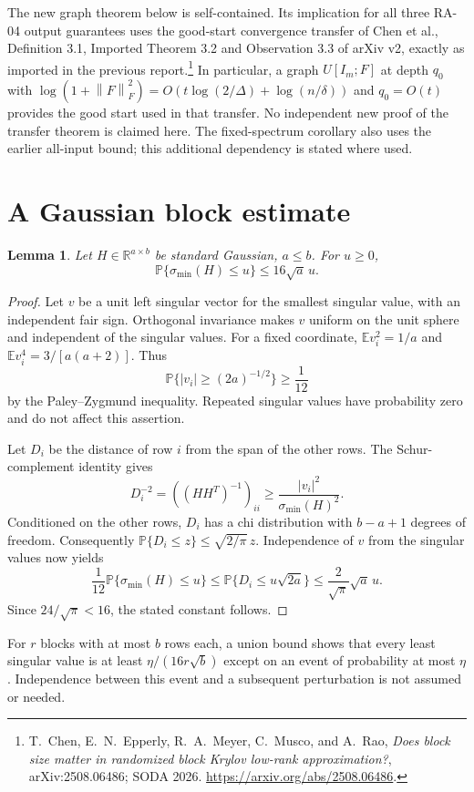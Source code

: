 \documentclass[11pt]{article}
\newtheorem{lemma}[theorem]{Lemma}
\newcommand{\R}{\mathbb R}
\newcommand{\norm}[1]{\left\lVert#1\right\rVert}
\newcommand{\Prob}{\mathbb P}
\begin{document}
The new graph theorem below is self-contained. Its implication for all three
RA-04 output guarantees uses the good-start convergence transfer of Chen et
al., Definition 3.1, Imported Theorem 3.2 and Observation 3.3 of arXiv v2, exactly as imported in the previous report.\footnote{T.~Chen,
E.~N.~Epperly, R.~A.~Meyer, C.~Musco, and A.~Rao, \emph{Does block size matter
in randomized block Krylov low-rank approximation?}, arXiv:2508.06486;
SODA 2026. \url{https://arxiv.org/abs/2508.06486}.}
In particular, a graph $U[I_m;F]$ at depth $q_0$ with
$\log(1+\norm{F}_F^2)=O(t\log(2/\Delta)+\log(n/\delta))$ and $q_0=O(t)$
provides the good start used in that transfer. No independent new proof of
the transfer theorem is claimed here. The fixed-spectrum corollary also uses
the earlier all-input bound; this additional dependency is stated where used.

\section{A Gaussian block estimate}
\begin{lemma}\label{gaussian}
Let $H\in\R^{a\times b}$ be standard Gaussian, $a\le b$. For $u\ge0$,
\[
 \Prob\{\sigma_{\min}(H)\le u\}\le16\sqrt a\,u.
\]
\end{lemma}
\begin{proof}
Let $v$ be a unit left singular vector for the smallest singular value, with
an independent fair sign. Orthogonal invariance makes $v$ uniform on the unit
sphere and independent of the singular values. For a fixed coordinate,
$\mathbb E v_i^2=1/a$ and $\mathbb E v_i^4=3/[a(a+2)]$. Thus
\[
 \Prob\{|v_i|\ge(2a)^{-1/2}\}\ge\frac1{12}
\]
by the Paley--Zygmund inequality. Repeated singular values have probability
zero and do not affect this assertion.

Let $D_i$ be the distance of row $i$ from the span of the other rows. The
Schur-complement identity gives
\[
 D_i^{-2}=((HH^T)^{-1})_{ii}\ge
 \frac{|v_i|^2}{\sigma_{\min}(H)^2}.
\]
Conditioned on the other rows, $D_i$ has a chi distribution with $b-a+1$
degrees of freedom. Consequently
$\Prob\{D_i\le z\}\le\sqrt{2/\pi}\,z$. Independence of $v$ from the
singular values now yields
\[
 \frac1{12}\Prob\{\sigma_{\min}(H)\le u\}
 \le\Prob\{D_i\le u\sqrt{2a}\}
 \le\frac2{\sqrt\pi}\sqrt a\,u.
\]
Since $24/\sqrt\pi<16$, the stated constant follows.
\end{proof}
For $r$ blocks with at most $b$ rows each, a union bound shows that every
least singular value is at least $\eta/(16r\sqrt b)$ except on an event of
probability at most $\eta$. Independence between this event and a subsequent
perturbation is not assumed or needed.
\end{document}
